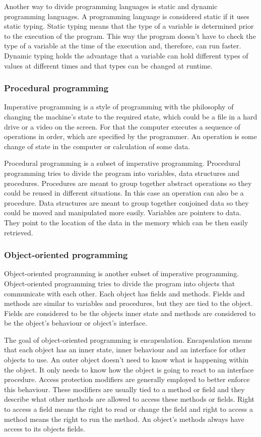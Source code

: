 Another way to divide programming languages is static and dynamic programming languages. A programming language is considered static if it uses static typing. Static typing means that the type of a variable is determined prior to the execution of the program. This way the program doesn't have to check the type of a variable at the time of the execution and, therefore, can run faster. Dynamic typing holds the advantage that a variable can hold different types of values at different times and that types can be changed at runtime.

\subsubsection{Procedural programming}
Imperative programming is a style of programming with the philosophy of changing the machine's state to the required state, which could be a file in a hard drive or a video on the screen. For that the computer executes a sequence of operations in order, which are specified by the programmer. An operation is some change of state in the computer or calculation of some data.

Procedural programming is a subset of imperative programming. Procedural programming tries to divide the program into variables, data structures and procedures. Procedures are meant to group together abstract operations so they could be reused in different situations. In this case an operation can also be a procedure. Data structures are meant to group together conjoined data so they could be moved and manipulated more easily. Variables are pointers to data. They point to the location of the data in the memory which can be then easily retrieved.

\subsubsection{Object-oriented programming}
Object-oriented programming is another subset of imperative programming. Object-oriented programming tries to divide the program into objects that communicate with each other. Each object has fields and methods. Fields and methods are similar to variables and procedures, but they are tied to the object. Fields are considered to be the objects inner state and methods are considered to be the object's behaviour or object's interface.

The goal of object-oriented programming is encapsulation. Encapsulation means
that each object has an inner state, inner behaviour and an interface for other
objects to use. An outer object doesn't need to know what is happening within
the object. It only needs to know how the object is going to react to an
interface procedure. Access protection modifiers are generally employed to
better enforce this behaviour. These modifiers are usually tied to a method or
field and they describe what other methods are allowed to access these methods
or fields. Right to access a field means the right to read or change the field
and right to access a method means the right to run the
method.\cite{access-modifiers}
An object's methods always have access to its objects fields.

